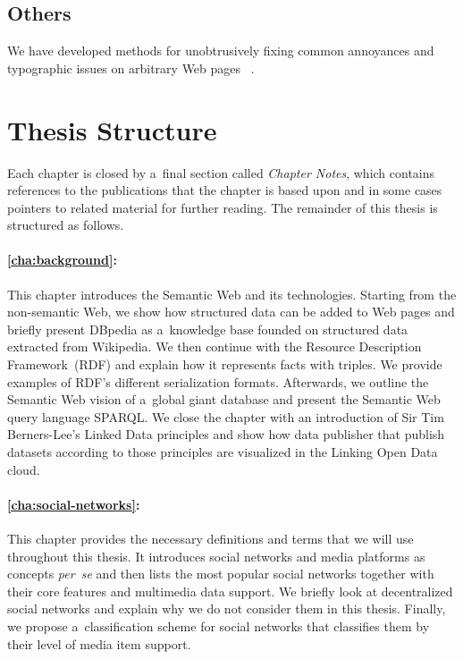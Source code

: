 \subsection{Others}

We have developed methods for unobtrusively fixing
common annoyances and typographic issues
on arbitrary Web pages~%
\cite{steiner2012xkcd37}.

\section{Thesis Structure}

Each chapter is closed by a~final section called
\emph{Chapter Notes}, which contains references to the publications
that the chapter is based upon
and in some cases pointers to related material for further reading.
The remainder of this thesis is structured as follows.

\paragraph{\autoref{cha:background}:}

This chapter introduces the Semantic Web and its technologies.
Starting from the non-semantic Web,
we show how structured data can be added to Web pages
and briefly present DBpedia as a~knowledge base
founded on structured data extracted from Wikipedia.
We then continue with the Resource Description Framework~(RDF)
and explain how it represents facts with triples.
We provide examples of RDF's different serialization formats.
Afterwards, we outline the Semantic Web vision of
a~global giant database and present the Semantic Web
query language SPARQL.
We close the chapter with an introduction of Sir Tim Berners-Lee's
Linked Data principles and show how data publisher that publish
datasets according to those principles are visualized in the
Linking Open Data cloud.

\paragraph{\autoref{cha:social-networks}:}

This chapter provides the necessary definitions and terms
that we will use throughout this thesis.
It introduces social networks and media platforms as concepts
\emph{per~se} and then lists the most popular social networks
together with their core features and multimedia data support.
We briefly look at decentralized social networks and explain
why we do not consider them in this thesis.
Finally, we propose a~classification scheme for social networks
that classifies them by their level of media item support.

